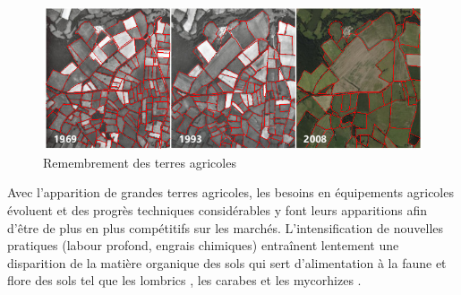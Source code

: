 \documentclass[../thesis.tex]{subfiles}
\begin{document}
    
    \vfill
    \begin{figure}[H]
        \centering
        \includegraphics[width=0.6\linewidth]{img/intro/intro-bocage-2}
        \caption{Remembrement des terres agricoles}
        \label{fig:02-intro-bocage}
    \end{figure}
    \vfill
    
    
    Avec l'apparition de grandes terres agricoles, les besoins en équipements agricoles évoluent et des progrès techniques considérables y font leurs apparitions afin d'être de plus en plus compétitifs sur les marchés. L'intensification de nouvelles pratiques (labour profond, engrais chimiques) entraînent lentement une disparition de la matière organique des sols \cite{vitinnov2017journees} qui sert d'alimentation à la faune et flore des sols \cite{pujol2014journee} tel que les lombrics \cite{pelosi2008modelisation}, les carabes \cite{carbonne:tel-03163078} et les mycorhizes \cite{zerbib2018relations}.
    
\end{document}
